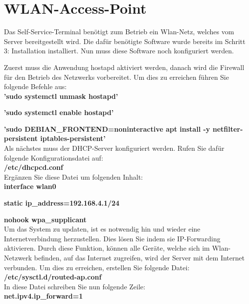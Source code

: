 \section{WLAN-Access-Point}

\noindent Das Self-Service-Terminal benötigt zum Betrieb ein Wlan-Netz, welches vom Server bereitgestellt wird. Die dafür benötigte Software wurde bereits im Schritt 3: \glqq Installation\grqq{} installiert. Nun muss diese Software noch konfiguriert werden.\par
\noindent Zuerst muss die Anwendung hostapd aktiviert werden, danach wird die Firewall für den Betrieb des Netzwerks vorbereitet. Um dies zu erreichen führen Sie folgende Befehle aus:\\

\textbf{’sudo systemctl unmask hostapd’}\par
\textbf{’sudo systemctl enable hostapd’}\par
\textbf{’sudo DEBIAN\_FRONTEND=noninteractive apt install -y netfilter-\indent persistent iptables-persistent’}\\

\noindent Als nächstes muss der DHCP-Server konfiguriert werden. Rufen Sie dafür folgende Konfigurationsdatei auf:\\

\textbf{/etc/dhcpcd.conf}\\

\noindent Ergänzen Sie diese Datei um folgenden Inhalt:\\

\textbf{interface wlan0}\par
\textbf{static ip\_address=192.168.4.1/24}\par
\textbf{nohook wpa\_supplicant}\\

\noindent Um das System zu updaten, ist es notwendig hin und wieder eine Internetverbindung herzustellen. Dies lösen Sie indem sie IP-Forwarding aktivieren. Durch diese Funktion, können alle Geräte, welche sich im Wlan-Netzwerk befinden, auf das Internet zugreifen, wird der Server mit dem Internet verbunden. Um dies zu erreichen, erstellen Sie folgende Datei:\\

\textbf{/etc/sysctl.d/routed-ap.conf}\\

\noindent In diese Datei schreiben Sie nun folgende Zeile:\\

\textbf{net.ipv4.ip\_forward=1}\\

